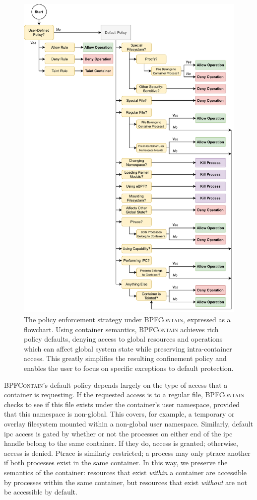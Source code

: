 \documentclass[
  fontsize=12pt,
  titlepage=firstiscover,
  paper=letter,
oneside,
  cleardoublepage=plain,
  parskip=half-,
  DIV=10,
  parindent,
  appendixprefix,
  chapterprefix,
  listof=totoc,
]{scrbook}
\newcommand{\bpfcontain}{\textsc{BPFContain}}
\begin{document}
\begin{figure}[p]
  \centering
  \includegraphics[width=0.75\linewidth]{figs/bpfcontain/enforcement.pdf}
  \caption[The policy enforcement strategy under \bpfcontain{}]{
    The policy enforcement strategy under \bpfcontain{}, expressed as a flowchart. Using
    container semantics, \bpfcontain{} achieves rich policy defaults, denying access to
    global resources and operations which can affect global system state while preserving
    intra-container access. This greatly simplifies the resulting confinement policy and
    enables the user to focus on specific exceptions to default protection.
  }\label{fig:bpfcontain-enforcement}
\end{figure}

\bpfcontain{}'s default policy depends largely on the type of access that a container is
requesting. If the requested access is to a regular file, \bpfcontain{} checks to see if
this file exists under the container's user namespace, provided that this namespace is
non-global. This covers, for example, a temporary or overlay filesystem mounted within
a non-global user namespace.  Similarly, default \gls{ipc} access is gated by whether or
not the processes on either end of the \gls{ipc} handle belong to the same container. If
they do, access is granted; otherwise, access is denied. Ptrace is similarly restricted;
a process may only ptrace another if both processes exist in the same container. In this
way, we preserve the semantics of the container: resources that exist \textit{within}
a container are accessible by processes within the same container, but resources
that exist \textit{without} are not be accessible by default.
\end{document}
